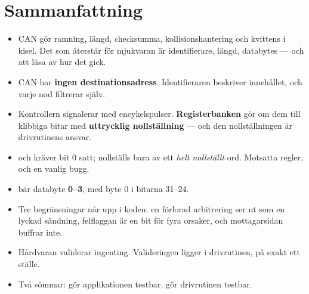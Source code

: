 \section*{Sammanfattning}

\begin{itemize}
  \item CAN gör ramning, längd, checksumma, kollisionshantering och kvittens i kisel. Det som
    återstår för mjukvaran är identifierare, längd, databytes --- och att läsa av hur det gick.
  \item CAN har \textbf{ingen destinationsadress}. Identifieraren beskriver innehållet, och varje
    nod filtrerar själv.
  \item Kontrollern signalerar med encykelspulser. \textbf{Registerbanken} gör om dem till
    klibbiga bitar med \textbf{uttrycklig nollställning} --- och den nollställningen är
    drivrutinens ansvar.
  \item {} och  kräver bit 0 satt;  nollställs bara av
    ett \emph{helt nollställt} ord. Motsatta regler, och en vanlig bugg.
  \item {} bär databyte \textbf{0--3}, med byte 0 i bitarna 31--24.
  \item Tre begränsningar når upp i koden: en förlorad arbitrering ser ut som en lyckad sändning,
    felflaggan är en bit för fyra orsaker, och mottagarsidan buffrar inte.
  \item Hårdvaran validerar ingenting. Valideringen ligger i drivrutinen, på exakt ett ställe.
  \item Två sömmar:  gör applikationen testbar,  gör
    drivrutinen testbar.
\end{itemize}
